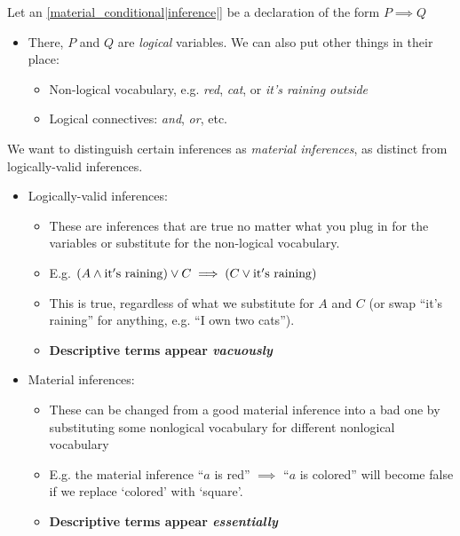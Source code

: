 Let an \ref{material_conditional|inference|} be a declaration of the form $P \implies Q$
\begin{itemize}
    \item There, $P$ and $Q$ are \emph{logical} variables. We can also put other things in their place:
    \begin{itemize}
        \item Non-logical vocabulary, e.g. \emph{red}, \emph{cat}, or \emph{it's raining outside}
        \item Logical connectives: \emph{and}, \emph{or}, etc.
    \end{itemize}
\end{itemize}

We want to distinguish certain inferences as \emph{material inferences}, as distinct from logically-valid inferences.
\begin{itemize}

\item Logically-valid inferences:
    \begin{itemize}
        \item These are inferences that are true no matter what you plug in for the variables or substitute for the non-logical vocabulary.
        \item E.g. $(A \land {\rm it's\ raining}) \lor C \implies (C \lor {\rm it's\ raining})$
        \item This is true, regardless of what we substitute for $A$ and $C$ (or swap ``it's raining'' for anything, e.g. ``I own two cats'').
        \item \textbf{Descriptive terms appear \emph{vacuously}}
    \end{itemize}
\item Material inferences:
    \begin{itemize}
        \item These can be changed from a good material inference into a bad one by substituting some nonlogical vocabulary for different nonlogical vocabulary
        \item E.g. the material inference ``$a$ is red'' $\implies$ ``$a$ is colored'' will become false if we replace `colored' with `square'.
        \item \textbf{Descriptive terms appear \emph{essentially}}
    \end{itemize}
\end{itemize}
